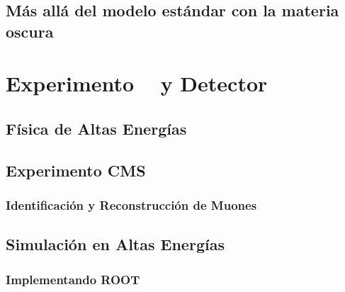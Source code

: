 \documentclass[12pt]{report}
\begin{document}
	\section{M\'as all\'a del modelo est\'andar con la materia oscura}
	
				


\chapter{Experimento \LHC ~ y Detector \CMS}

		
	\section{Física de Altas Energías}
	
	
	\section{Experimento CMS}\label{Experimento_CMS}
	
	
	
		\subsection{Identificación y Reconstrucción de Muones}
		
		
	\section{Simulación en Altas Energías}
	
	
		\subsection{Implementando ROOT}\label{C_root}
		
		
		
\end{document}

